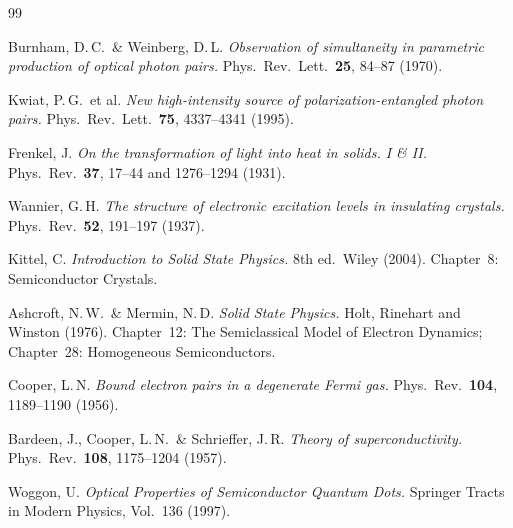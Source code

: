 \begin{thebibliography}{99}

Burnham, D.\,C.\ \& Weinberg, D.\,L.
\textit{Observation of simultaneity in parametric production of
optical photon pairs.}
Phys.\ Rev.\ Lett.\ \textbf{25}, 84--87 (1970).

Kwiat, P.\,G.\ et al.
\textit{New high-intensity source of polarization-entangled photon pairs.}
Phys.\ Rev.\ Lett.\ \textbf{75}, 4337--4341 (1995).

Frenkel, J.
\textit{On the transformation of light into heat in solids. I \& II.}
Phys.\ Rev.\ \textbf{37}, 17--44 and 1276--1294 (1931).

Wannier, G.\,H.
\textit{The structure of electronic excitation levels in
insulating crystals.}
Phys.\ Rev.\ \textbf{52}, 191--197 (1937).

Kittel, C.
\textit{Introduction to Solid State Physics.}
8th ed.\ Wiley (2004). Chapter~8: Semiconductor Crystals.

Ashcroft, N.\,W.\ \& Mermin, N.\,D.
\textit{Solid State Physics.}
Holt, Rinehart and Winston (1976). Chapter~12: The Semiclassical
Model of Electron Dynamics; Chapter~28: Homogeneous Semiconductors.

Cooper, L.\,N.
\textit{Bound electron pairs in a degenerate Fermi gas.}
Phys.\ Rev.\ \textbf{104}, 1189--1190 (1956).

Bardeen, J., Cooper, L.\,N.\ \& Schrieffer, J.\,R.
\textit{Theory of superconductivity.}
Phys.\ Rev.\ \textbf{108}, 1175--1204 (1957).

Woggon, U.
\textit{Optical Properties of Semiconductor Quantum Dots.}
Springer Tracts in Modern Physics, Vol.\ 136 (1997).

\end{thebibliography}
